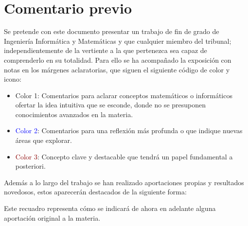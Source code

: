
\section*{Comentario previo}

Se pretende con este documento presentar un  trabajo de fin de grado de Ingeniería Informática y Matemáticas y que cualquier miembro del tribunal; 
independientemente de la vertiente a la que pertenezca sea capaz de comprenderlo en su totalidad.  
Para ello se ha acompañado la exposición con notas en los márgenes aclaratorias, que siguen el siguiente código de color y icono: 

\begin{itemize}
    \item  \iconoAclaraciones \textcolor{dark_green}{ Color 1}: Comentarios para 
    aclarar conceptos matemáticos o informáticos ofertar la idea intuitiva que 
    se esconde, donde no se presuponen conocimientos avanzados en 
    la materia. 
    \item  \iconoProfundizar \textcolor{blue}{  Color 2}: Comentarios para una reflexión más profunda o que indique nuevas áreas que explorar. 
    \item  \iconoClave  \textcolor{darkRed}{  Color 3}: Concepto clave y destacable que tendrá un papel fundamental a posteriori.  
\end{itemize}


Además a lo largo del trabajo se han realizado aportaciones propias y resultados novedosos, estos aparecerán destacados de la siguiente forma: 

\begin{aportacionOriginal}
    Este recuadro representa cómo se indicará de ahora en adelante alguna aportación original a la materia. 
\end{aportacionOriginal}
